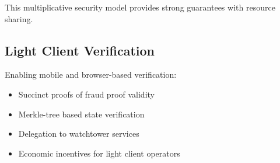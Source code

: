 This multiplicative security model provides strong guarantees with resource sharing.

\subsection{Light Client Verification}

Enabling mobile and browser-based verification:

\begin{itemize}
    \item Succinct proofs of fraud proof validity
    \item Merkle-tree based state verification
    \item Delegation to watchtower services
    \item Economic incentives for light client operators
\end{itemize}


